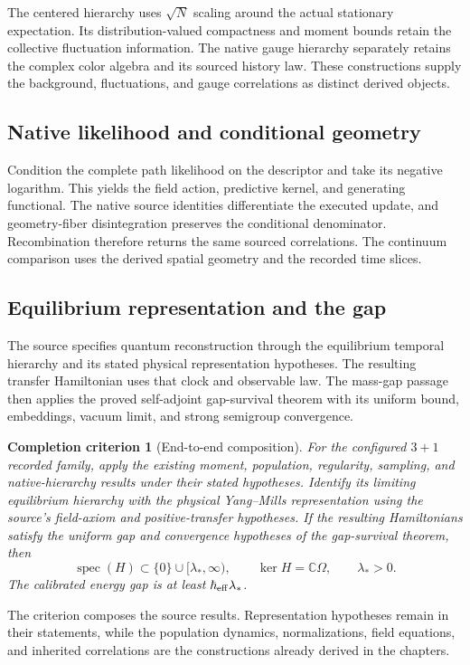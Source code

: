 \documentclass[11pt,a4paper]{article}
\newtheorem{criterion}{Completion criterion}
\newcommand{\Spec}{\operatorname{spec}}
\begin{document}
The centered hierarchy uses \(\sqrt N\) scaling around the actual stationary expectation. Its distribution-valued compactness and moment bounds retain the collective fluctuation information. The native gauge hierarchy separately retains the complex color algebra and its sourced history law. These constructions supply the background, fluctuations, and gauge correlations as distinct derived objects.

\subsection{Native likelihood and conditional geometry}
Condition the complete path likelihood on the descriptor and take its negative logarithm. This yields the field action, predictive kernel, and generating functional. The native source identities differentiate the executed update, and geometry-fiber disintegration preserves the conditional denominator. Recombination therefore returns the same sourced correlations. The continuum comparison uses the derived spatial geometry and the recorded time slices.

\subsection{Equilibrium representation and the gap}
The source specifies quantum reconstruction through the equilibrium temporal hierarchy and its stated physical representation hypotheses. The resulting transfer Hamiltonian uses that clock and observable law. The mass-gap passage then applies the proved self-adjoint gap-survival theorem with its uniform bound, embeddings, vacuum limit, and strong semigroup convergence.

\begin{criterion}[End-to-end composition]
For the configured \(3+1\) recorded family, apply the existing moment, population, regularity, sampling, and native-hierarchy results under their stated hypotheses. Identify its limiting equilibrium hierarchy with the physical Yang--Mills representation using the source's field-axiom and positive-transfer hypotheses. If the resulting Hamiltonians satisfy the uniform gap and convergence hypotheses of the gap-survival theorem, then
\[
\Spec(H)\subset\{0\}\cup[\lambda_*,\infty),\qquad
\ker H=\mathbb C\Omega,\qquad\lambda_*>0.
\]
The calibrated energy gap is at least \(\hbar_{\rm eff}\lambda_*\).
\end{criterion}
The criterion composes the source results. Representation hypotheses remain in their statements, while the population dynamics, normalizations, field equations, and inherited correlations are the constructions already derived in the chapters.
\end{document}
